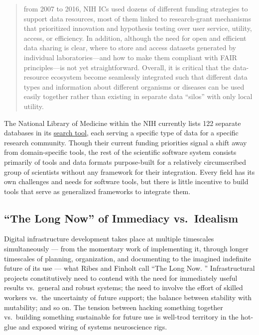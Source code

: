 \documentclass[10pt]{tufte-book}
\begin{document}
\begin{quote}
from 2007 to 2016, NIH ICs used dozens of different funding strategies
to support data resources, most of them linked to research-grant
mechanisms that prioritized innovation and hypothesis testing over user
service, utility, access, or efficiency. In addition, although the need
for open and efficient data sharing is clear, where to store and access
datasets generated by individual laboratories---and how to make them
compliant with FAIR principles---is not yet straightforward. Overall, it
is critical that the data-resource ecosystem become seamlessly
integrated such that different data types and information about
different organisms or diseases can be used easily together rather than
existing in separate data ``silos'' with only local utility.
\end{quote}

The National Library of Medicine within the NIH currently lists 122
separate databases in its
\href{https://eresources.nlm.nih.gov/nlm_eresources/}{search tool}, each
serving a specific type of data for a specific research community.
Though their current funding priorities signal a shift away from
domain-specific tools, the rest of the scientific software system
consists primarily of tools and data formats purpose-built for a
relatively circumscribed group of scientists without any framework for
their integration. Every field has its own challenges and needs for
software tools, but there is little incentive to build tools that serve
as generalized frameworks to integrate them.


\subsection{``The Long Now'' of Immediacy
vs.~Idealism}

Digital infrastructure development takes place at multiple timescales
simultaneously --- from the momentary work of implementing it, through
longer timescales of planning, organization, and documenting to the
imagined indefinite future of its use --- what Ribes and Finholt call
``The Long Now. \citep{ribesLongNowTechnology2009} ''
Infrastructural projects constitutively need to contend with the need
for immediately useful results vs.~general and robust systems; the need
to involve the effort of skilled workers vs.~the uncertainty of future
support; the balance between stability with mutability; and so on. The
tension between hacking something together vs.~building something
sustainable for future use is well-trod territory in the hot-glue and
exposed wiring of systems neuroscience rigs.
\end{document}
